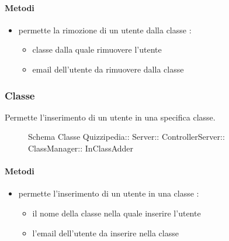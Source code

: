 \paragraph{Metodi}
\begin{itemize}
\item {}
\newline
permette la rimozione di un utente dalla classe
\newline
{} :
\begin{itemize}
\item {}
\newline
classe dalla quale rimuovere l'utente
\item {}
\newline
email dell'utente da rimuovere dalla classe
\end{itemize}
\end{itemize}
\subsubsection{Classe }
Permette l'inserimento di un utente in una specifica classe.
\begin{figure}[H]
\centering
\noindent{}
\caption[Schema Classe InClassAdder]{Schema Classe Quizzipedia:: Server:: ControllerServer:: ClassManager:: InClassAdder}
\end{figure}
\paragraph{Metodi}
\begin{itemize}
\item {}
\newline
permette l'inserimento di un utente in una classe
\newline
{} :
\begin{itemize}
\item {}
\newline
il nome della classe nella quale inserire l'utente
\item {}
\newline
l'email dell'utente da inserire nella classe
\end{itemize}
\end{itemize}
